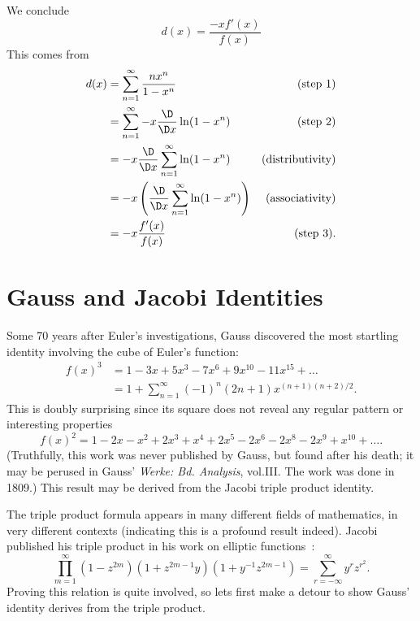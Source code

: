 \documentclass{article}
\begin{document}
 We conclude
\begin{equation}
  d(x) = \frac{-xf'(x)}{f(x)}
\end{equation}
This comes from
\begin{align*}
d(x) &= \sum^{\infty}_{n=1}\frac{nx^{n}}{1 - x^{n}}&\mbox{(step 1)}\\
&= \sum^{\infty}_{n=1}-x\frac{\D}{\D x}\ln(1 - x^{n})&\mbox{(step 2)}\\
&= -x\frac{\D}{\D x}\sum^{\infty}_{n=1}\ln(1 - x^{n})&\mbox{(distributivity)}\\
&= -x\left(\frac{\D}{\D x}\sum^{\infty}_{n=1}\ln(1 - x^{n})\right)&\mbox{(associativity)}\\
&= -x\frac{f'(x)}{f(x)}&\mbox{(step 3)}.
\end{align*}

\section{Gauss and Jacobi Identities}

Some 70 years after Euler's investigations, Gauss discovered the most
startling identity involving the cube of Euler's function:
\begin{equation}
  \begin{split}
f(x)^{3} &= 1 - 3x + 5x^{3} - 7x^{6} + 9x^{10} - 11x^{15} + \dots\\
    &= 1 + \sum^{\infty}_{n=1} (-1)^{n}(2n+1)x^{(n+1)(n+2)/2}.
  \end{split}
\end{equation}
This is doubly surprising since its square does not reveal any regular
pattern or interesting properties
\begin{equation}
  f(x)^{2} = 1 - 2x - x^{2} + 2x^{3} + x^{4} + 2x^{5} - 2x^{6} - 2x^{8}
  - 2x^{9} + x^{10} + \dots.
\end{equation}
(Truthfully, this work was never published by Gauss, but found after his
death; it may be perused in Gauss' \emph{Werke: Bd. Analysis},
vol.III. The work was done in 1809.)
This result may be derived from the Jacobi triple product identity.

The triple product formula appears in many different fields of
mathematics, in very different contexts (indicating this is a profound
result indeed). Jacobi published his triple product in his work on
elliptic functions~\cite{jacobi}:
\begin{equation}
  \prod^{\infty}_{m=1}
  (1 - z^{2m})
  (1 + z^{2m-1}y)
  (1 + y^{-1}z^{2m-1}) = \sum_{r=-\infty}^{\infty} y^{r}z^{r^{2}}.
\end{equation}
Proving this relation is quite involved, so lets first make a detour to
show Gauss' identity derives from the triple product.
\end{document}
